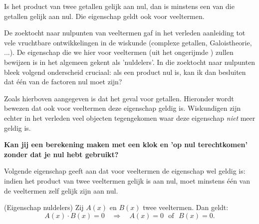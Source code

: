 \documentclass{ximera}
\begin{document}
	\author{Koen de Naeghel - Wiskunde Op Maat}
    \xmsource

	
Is het product van twee getallen gelijk aan nul, dan is minstens een van die getallen gelijk aan nul. Die eigenschap geldt ook voor veeltermen. 

De zoektocht naar nulpunten van veeltermen gaf in het verleden aanleiding tot vele vruchtbare ontwikkelingen in de wiskunde (complexe getallen, Galoistheorie, ...). De eigenschap die we hier voor veeltermen (uit het ongerijmde ) zullen bewijzen is in het algemeen gekent als 'nuldelers'. In die zoektocht naar nulpunten bleek volgend onderscheid cruciaal: als een product nul is, kan ik dan besluiten dat één van de factoren nul moet zijn? 

Zoals hierboven aangegeven is dat het geval voor getallen. Hieronder wordt bewezen dat ook voor veeltermen deze eigenschap geldig is. Wiskundigen zijn echter in het verleden veel objecten tegengekomen waar deze eigenschap \textit{niet} meer geldig is. 

\textbf{Kan jij een berekening maken met een klok en 'op nul terechtkomen' zonder dat je nul hebt gebruikt? }
	

Volgende eigenschap geeft aan dat voor veeltermen de eigenschap wel geldig is: indien het product van twee veeltermen gelijk is aan nul, moet minstens één van de veeltermen zelf gelijk zijn aan nul. 


\begin{proposition}(Eigenschap nuldelers)
Zij \(A(x)\) en \(B(x)\) twee veeltermen. Dan geldt: 
\[
A(x)\cdot B(x) = 0 \quad \Rightarrow \quad A(x) = 0 \,\,\text{ of } \,\, B(x) = 0.
\]
\end{proposition} 
\end{document}
